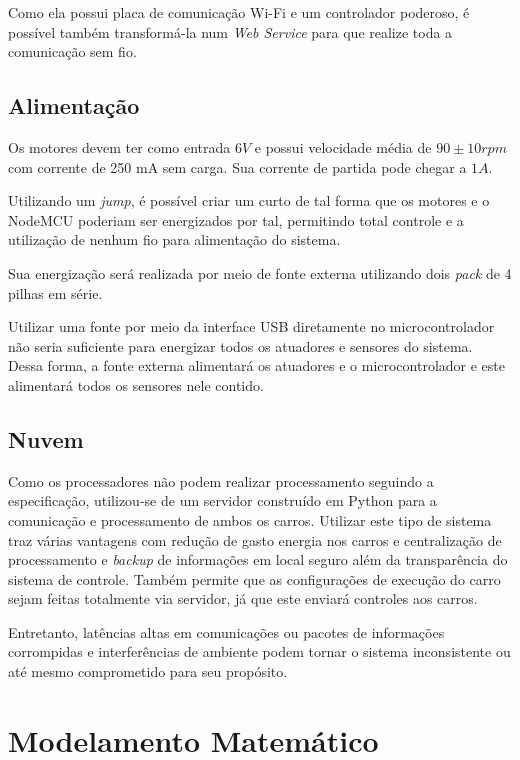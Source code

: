 \documentclass[portugues, brazil, a4paper,12pt]{article}
\begin{document}
		Como ela possui placa de comunicação Wi-Fi e um controlador poderoso, é possível também transformá-la num \textit{Web Service} para que realize toda a comunicação sem fio.


	\subsection{Alimentação}

		Os motores devem ter como entrada $6V$ e possui velocidade média de $90\pm10rpm$ com corrente de 250 mA sem carga. Sua corrente de partida pode chegar a $1A$.

		Utilizando um \textit{jump}, é possível criar um curto de tal forma que os motores e o NodeMCU poderiam ser energizados por tal, permitindo total controle e a utilização de nenhum fio para alimentação do sistema.

		Sua energização será realizada por meio de fonte externa utilizando dois \textit{pack} de 4 pilhas em série.

		Utilizar uma fonte por meio da interface USB diretamente no microcontrolador não seria suficiente para energizar todos os atuadores e sensores do sistema. Dessa forma, a fonte externa alimentará os atuadores e o microcontrolador e este alimentará todos os sensores nele contido.


	\subsection{Nuvem}
		Como os processadores não podem realizar processamento seguindo a especificação, utilizou-se de um servidor construído em Python para a comunicação e processamento de ambos os carros. Utilizar este tipo de sistema traz várias vantagens com redução de gasto energia nos carros e centralização de processamento e \textit{backup} de informações em local seguro além da transparência do sistema de controle. Também permite que as configurações de execução do carro sejam feitas totalmente via servidor, já que este enviará controles aos carros.

		Entretanto, latências altas em comunicações ou pacotes de informações corrompidas e interferências de ambiente podem tornar o sistema inconsistente ou até mesmo comprometido para seu propósito.


\section{Modelamento Matemático} \label{sec:math}
\end{document}
